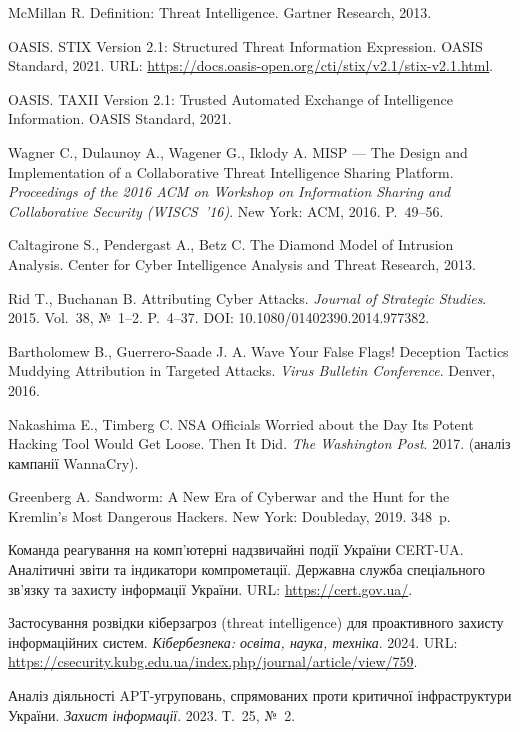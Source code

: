 
 McMillan R. Definition: Threat Intelligence. Gartner Research, 2013.

 OASIS. STIX Version 2.1: Structured Threat Information Expression. OASIS Standard, 2021. URL: \url{https://docs.oasis-open.org/cti/stix/v2.1/stix-v2.1.html}.

 OASIS. TAXII Version 2.1: Trusted Automated Exchange of Intelligence Information. OASIS Standard, 2021.

 Wagner C., Dulaunoy A., Wagener G., Iklody A. MISP --- The Design and Implementation of a Collaborative Threat Intelligence Sharing Platform. \emph{Proceedings of the 2016 ACM on Workshop on Information Sharing and Collaborative Security (WISCS~'16)}. New York: ACM, 2016. P.~49--56.

 Caltagirone S., Pendergast A., Betz C. The Diamond Model of Intrusion Analysis. Center for Cyber Intelligence Analysis and Threat Research, 2013.

 Rid T., Buchanan B. Attributing Cyber Attacks. \emph{Journal of Strategic Studies}. 2015. Vol.~38, №~1--2. P.~4--37. DOI: 10.1080/01402390.2014.977382.

 Bartholomew B., Guerrero-Saade J. A. Wave Your False Flags! Deception Tactics Muddying Attribution in Targeted Attacks. \emph{Virus Bulletin Conference}. Denver, 2016.

 Nakashima E., Timberg C. NSA Officials Worried about the Day Its Potent Hacking Tool Would Get Loose. Then It Did. \emph{The Washington Post}. 2017. (аналіз кампанії WannaCry).

 Greenberg A. Sandworm: A New Era of Cyberwar and the Hunt for the Kremlin's Most Dangerous Hackers. New York: Doubleday, 2019. 348~p.

 Команда реагування на комп'ютерні надзвичайні події України CERT-UA. Аналітичні звіти та індикатори компрометації. Державна служба спеціального зв'язку та захисту інформації України. URL: \url{https://cert.gov.ua/}.

 Застосування розвідки кіберзагроз (threat intelligence) для проактивного захисту інформаційних систем. \emph{Кібербезпека: освіта, наука, техніка}. 2024. URL: \url{https://csecurity.kubg.edu.ua/index.php/journal/article/view/759}.

 Аналіз діяльності APT-угруповань, спрямованих проти критичної інфраструктури України. \emph{Захист інформації}. 2023. Т.~25, №~2.
